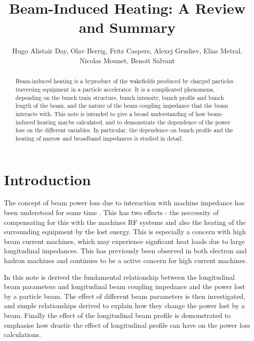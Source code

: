 \documentclass{cernrep}
\begin{document}
\title{Beam-Induced Heating: A Review and Summary}
\author{Hugo Alistair Day, Olav Berrig, Fritz Caspers, Alexej Grudiev, Elias Metral, Nicolas Mounet, Benoit Salvant}

\maketitle


\begin{abstract}
Beam-induced heating is a byproduct of the wakefields produced by charged particles traversing equipment in a particle accelerator. It is a complicated phenomena, depending on the bunch train structure, bunch intensity, bunch profile and bunch length of the beam, and the nature of the beam coupling impedance that the beam interacts with. This note is intended to give a broad understanding of how beam-induced heating maybe calculated, and to demonstrate the dependence of the power loss on the different variables. In particular, the dependence on bunch profile and the heating of narrow and broadband impedances is studied in detail.
\end{abstract}


\section{Introduction}

The concept of beam power loss due to interaction with machine impedance has been understood for some time \cite{Chao:PhysColEff, Ng:IntDepInstab}. This has two effects - the neccessity of compensating for this with the machines RF systems and also the heating of the surrounding equipment by the lost energy. This is especially a concern with high beam current machines, which may experience signficant heat loads due to large longitudinal impedances. This has previously been observed in both electron \cite{Pivi:PEP} and hadron machines \cite{Salvant:Heating,Metral:Heating} and continues to be a active concern for high current machines. 

In this note is derived the fundamental relationship between the longitudinal beam parameters and longitudinal beam coupling impedance and the power lost by a particle beam. The effect of different beam parameters is then investigated, and simple relationships derived to explain how they change the power lost by a beam. Finally the effect of the longitudinal beam profile is demonstrated to emphasise how drastic the effect of longitudinal profile can have on the power loss calculations.
\end{document}
